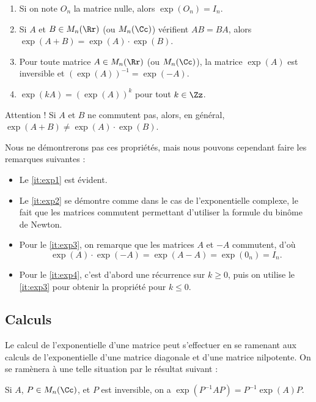 \documentclass[12pt, class=report,crop=false]{standalone}
\begin{document}
\begin{proposition}
\sauteligne
\begin{enumerate}
  \item \label{it:exp1} Si on note $O_n$ la matrice nulle, alors $\exp(O_n)=I_n$.
  \item \label{it:exp2} Si $A$ et $B\in M_n(\Rr)$ (ou $M_n(\Cc)$) vérifient $AB=BA$, alors $\exp(A+B)=\exp(A) \cdot \exp(B)$.
  \item \label{it:exp3} Pour toute matrice $A\in M_n(\Rr)$ (ou $M_n(\Cc)$), la matrice $\exp(A)$ est inversible et $(\exp(A))^{-1}=\exp(-A)$.
  \item \label{it:exp4} $\exp (kA) = (\exp(A))^k$ pour tout $k\in \Zz$.  
\end{enumerate} 
\end{proposition}

\begin{remarque*}
Attention ! Si $A$ et $B$ ne commutent pas, alors, en général, $\exp (A+B) \neq \exp (A) \cdot \exp (B)$.
\end{remarque*}


Nous ne démontrerons pas ces propriétés, mais nous pouvons cependant faire 
les remarques suivantes :
\begin{itemize}
  \item Le \ref{it:exp1} est évident.
  \item Le \ref{it:exp2} se démontre comme dans le cas de l'exponentielle 
complexe, le fait que les matrices commutent permettant d'utiliser 
la formule du binôme de Newton.
  \item Pour le \ref{it:exp3}, on remarque que les 
matrices $A$ et $-A$ commutent, d'où $$\exp(A) \cdot \exp(-A) = \exp(A-A)=\exp(0_n)=I_n.$$ 
  \item Pour le \ref{it:exp4}, c'est d'abord une récurrence sur $k \ge 0$, puis on utilise le \ref{it:exp3} pour obtenir la propriété pour $k \le 0$.
\end{itemize}




\subsection{Calculs}

Le calcul de l'exponentielle d'une matrice peut s'effectuer en se ramenant aux calculs de l'exponentielle d'une matrice diagonale et d'une matrice nilpotente.
On se ramènera à une telle situation par le résultat suivant :
\begin{lemme}
Si $A$, $P\in M_n(\Cc)$, et $P$ est inversible, on a $\exp(P^{-1}AP)=P^{-1}\exp(A) P$.
\end{lemme}
\end{document}
